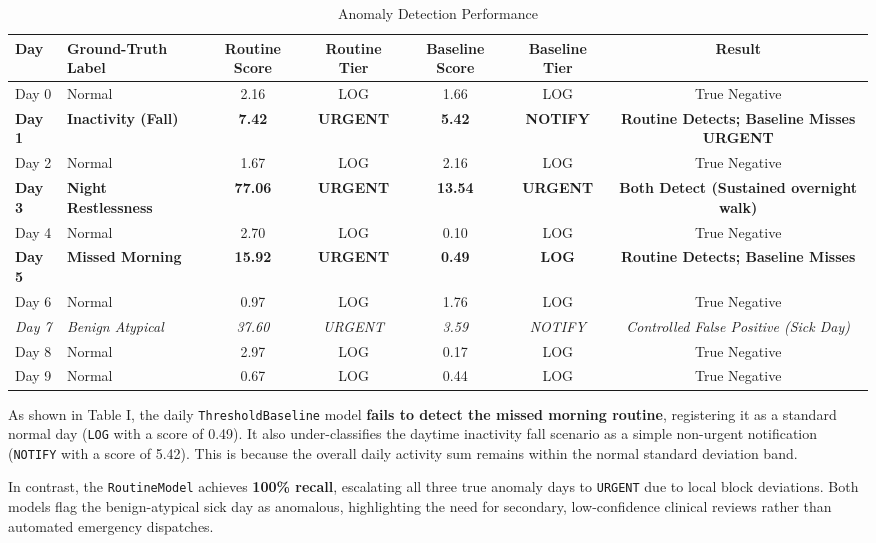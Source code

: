 \documentclass[conference]{IEEEtran}
\begin{document}
\begin{table}[htbp]
\centering
\caption{Anomaly Detection Performance}
\begin{tabular}{llccccc}
\toprule
Day & Ground-Truth Label & Routine Score & Routine Tier & Baseline Score & Baseline Tier & Result \\
\midrule
Day 0 & Normal & 2.16 & LOG & 1.66 & LOG & True Negative \\
\textbf{Day 1} & \textbf{Inactivity (Fall)} & \textbf{7.42} & \textbf{URGENT} & \textbf{5.42} & \textbf{NOTIFY} & \textbf{Routine Detects; Baseline Misses URGENT} \\
Day 2 & Normal & 1.67 & LOG & 2.16 & LOG & True Negative \\
\textbf{Day 3} & \textbf{Night Restlessness} & \textbf{77.06} & \textbf{URGENT} & \textbf{13.54} & \textbf{URGENT} & \textbf{Both Detect (Sustained overnight walk)} \\
Day 4 & Normal & 2.70 & LOG & 0.10 & LOG & True Negative \\
\textbf{Day 5} & \textbf{Missed Morning} & \textbf{15.92} & \textbf{URGENT} & \textbf{0.49} & \textbf{LOG} & \textbf{Routine Detects; Baseline Misses} \\
Day 6 & Normal & 0.97 & LOG & 1.76 & LOG & True Negative \\
\textit{Day 7} & \textit{Benign Atypical} & \textit{37.60} & \textit{URGENT} & \textit{3.59} & \textit{NOTIFY} & \textit{Controlled False Positive (Sick Day)} \\
Day 8 & Normal & 2.97 & LOG & 0.17 & LOG & True Negative \\
Day 9 & Normal & 0.67 & LOG & 0.44 & LOG & True Negative \\
\bottomrule
\end{tabular}
\end{table}

As shown in Table I, the daily \texttt{ThresholdBaseline} model \textbf{fails to detect the missed morning routine}, registering it as a standard normal day (\texttt{LOG} with a score of 0.49). It also under-classifies the daytime inactivity fall scenario as a simple non-urgent notification (\texttt{NOTIFY} with a score of 5.42). This is because the overall daily activity sum remains within the normal standard deviation band. 

In contrast, the \texttt{RoutineModel} achieves \textbf{100\% recall}, escalating all three true anomaly days to \texttt{URGENT} due to local block deviations. Both models flag the benign-atypical sick day as anomalous, highlighting the need for secondary, low-confidence clinical reviews rather than automated emergency dispatches.
\end{document}
